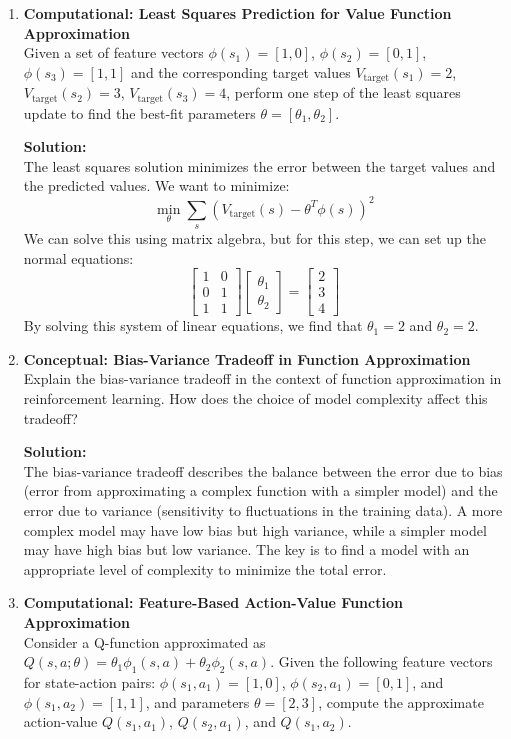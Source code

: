 \documentclass{article}
\begin{document}
\begin{enumerate}[label=Q\arabic*.]
\item \textbf{Computational: Least Squares Prediction for Value Function Approximation} \\
Given a set of feature vectors $\phi(s_1) = [1, 0]$, $\phi(s_2) = [0, 1]$, $\phi(s_3) = [1, 1]$ and the corresponding target values $V_{\text{target}}(s_1) = 2$, $V_{\text{target}}(s_2) = 3$, $V_{\text{target}}(s_3) = 4$, perform one step of the least squares update to find the best-fit parameters $\theta = [\theta_1, \theta_2]$.

\textbf{Solution:} \\
The least squares solution minimizes the error between the target values and the predicted values. We want to minimize:
\[
\min_\theta \sum_s \left( V_{\text{target}}(s) - \theta^T \phi(s) \right)^2
\]
We can solve this using matrix algebra, but for this step, we can set up the normal equations:
\[
\begin{bmatrix}
1 & 0 \\
0 & 1 \\
1 & 1
\end{bmatrix}
\begin{bmatrix}
\theta_1 \\
\theta_2
\end{bmatrix}
=
\begin{bmatrix}
2 \\
3 \\
4
\end{bmatrix}
\]
By solving this system of linear equations, we find that $\theta_1 = 2$ and $\theta_2 = 2$.

\item \textbf{Conceptual: Bias-Variance Tradeoff in Function Approximation} \\
Explain the bias-variance tradeoff in the context of function approximation in reinforcement learning. How does the choice of model complexity affect this tradeoff?

\textbf{Solution:} \\
The bias-variance tradeoff describes the balance between the error due to bias (error from approximating a complex function with a simpler model) and the error due to variance (sensitivity to fluctuations in the training data). A more complex model may have low bias but high variance, while a simpler model may have high bias but low variance. The key is to find a model with an appropriate level of complexity to minimize the total error.

\item \textbf{Computational: Feature-Based Action-Value Function Approximation} \\
Consider a Q-function approximated as $Q(s, a; \theta) = \theta_1 \phi_1(s, a) + \theta_2 \phi_2(s, a)$. Given the following feature vectors for state-action pairs: $\phi(s_1, a_1) = [1, 0]$, $\phi(s_2, a_1) = [0, 1]$, and $\phi(s_1, a_2) = [1, 1]$, and parameters $\theta = [2, 3]$, compute the approximate action-value $Q(s_1, a_1)$, $Q(s_2, a_1)$, and $Q(s_1, a_2)$.


\end{enumerate}
\end{document}
